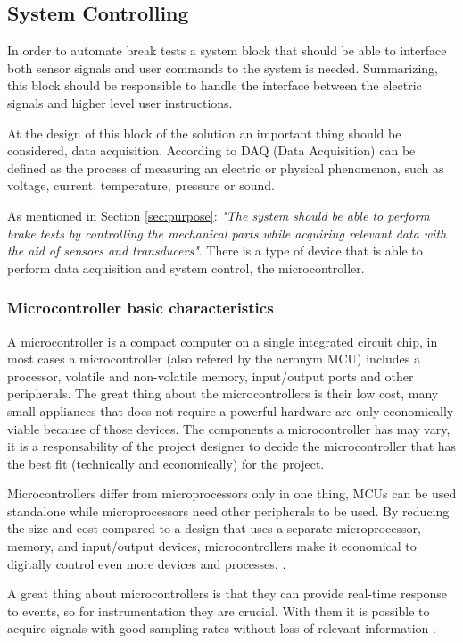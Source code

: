 \subsection{System Controlling}\label{ssec:mcu-review}
	In order to automate break tests a system block that should be able to interface both sensor signals and user commands to the system is needed. Summarizing, this block should be responsible to handle the interface between the electric signals and higher level user instructions.
	\par
	At the design of this block of the solution an important thing should be considered, data acquisition. According to \cite{ni-daq} DAQ (Data Acquisition) can be defined as the process of measuring an electric or physical phenomenon, such as voltage, current, temperature, pressure or sound.
	\par
	As mentioned in Section \ref{sec:purpose}: \textit{"The system should be able to perform brake tests by controlling the mechanical parts while acquiring relevant data with the aid of sensors and transducers"}. There is a type of device that is able to perform data acquisition and system control, the microcontroller.	
	\subsubsection{Microcontroller basic characteristics}\label{sssec:microcontroller-basic-characteristics}

		A microcontroller is a compact computer on a single integrated circuit chip, in most cases a microcontroller (also refered by the acronym MCU) includes a processor, volatile and non-volatile memory, input/output ports and other peripherals. The great thing about the microcontrollers is their low cost, many small appliances that does not require a powerful hardware are only economically viable because of those devices. The components a microcontroller has may vary, it is a responsability of the project designer to decide the microcontroller that has the best fit (technically and economically) for the project.
		\par
		Microcontrollers differ from microprocessors only in one thing, MCUs can be used standalone while microprocessors need other peripherals to be used. By reducing the size and cost compared to a design that uses a separate microprocessor, memory, and input/output devices, microcontrollers make it economical to digitally control even more devices and processes. \cite{mcuDef}.
		\par
		A great thing about microcontrollers is that they can provide real-time response to events, so for instrumentation they are crucial. With them it is possible to acquire signals with good sampling rates without loss of relevant information \cite{bartz2004data}.

